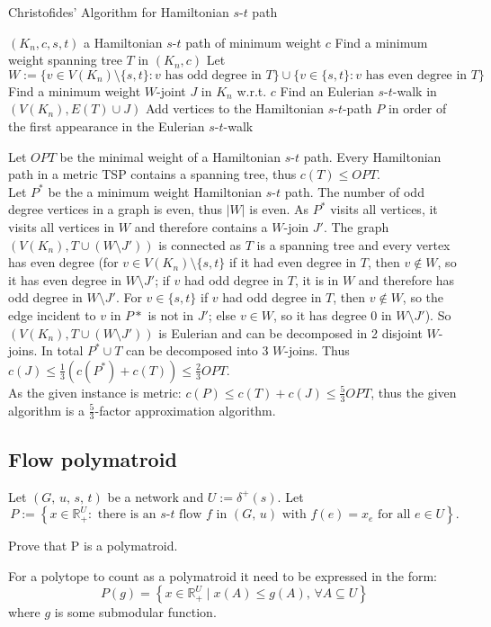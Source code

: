 \documentclass{article}
\newcommand{\R}{\mathbb{R}}
\begin{document}
  \begin{algorithm}
  \caption{Christofides' Algorithm for Hamiltonian $s$-$t$ path}\label{alg:cap}
  \begin{algorithmic}[1]
  \Require $(K_n, c, s, t)$
  \Ensure a Hamiltonian $s$-$t$ path of minimum weight $c$
  \State Find a minimum weight spanning tree $T$ in $(K_n,c)$
  \State Let $W:=\{v\in V(K_n)\setminus \{s,t\}: v \text{ has odd degree in }T \}\cup \{v\in \{s,t\}: v \text{ has even degree in }T \}$
  \State Find a minimum weight $W$-joint $J$ in $K_n$ w.r.t. $c$
  \State Find an Eulerian $s$-$t$-walk in $(V(K_n), E(T)\cup J)$
  \State Add vertices to the Hamiltonian $s$-$t$-path $P$ in order of the first appearance in the Eulerian $s$-$t$-walk
  \end{algorithmic}
  \end{algorithm}
  Let $OPT$ be the minimal weight of a Hamiltonian $s$-$t$ path. Every Hamiltonian path in a metric TSP contains a spanning tree, thus  $c(T)\leq OPT$.\\
  Let $P^*$ be the a minimum weight Hamiltonian $s$-$t$ path. The number of odd degree vertices in a graph is even, thus $|W|$ is even. As $P^*$ visits all vertices, it visits all vertices in $W$ and therefore contains a $W$-join $J'$. The graph $(V(K_n), T\cup (W\setminus J'))$ is connected as $T$ is a spanning tree and every vertex has even degree (for $v\in V(K_n)\setminus\{s,t\}$ if it had even degree in $T$, then $v\notin W$, so it has even degree in $W\setminus J'$; if $v$ had odd degree in $T$, it is in $W$ and therefore has odd degree in $W\setminus J'$. For $v\in \{s,t\}$ if $v$ had odd degree in $T$, then $v\notin W$, so the edge incident to $v$ in $P*$ is not in $J'$; else $v\in W$, so it has degree 0 in $W\setminus J'$). So $(V(K_n), T\cup (W\setminus J'))$ is Eulerian and can be decomposed in 2 disjoint $W$-joins.
  In total $P^*\cup T$ can be decomposed into 3 $W$-joins.
  Thus $c(J)\leq \frac 13 (c(P^*)+c(T))\leq\frac 23 OPT$.\\
  As the given instance is metric: $c(P)\leq c(T)+c(J)\leq \frac53 OPT$, thus the given algorithm is a  $\frac{5}{3}$-factor approximation algorithm.

  \subsection{Flow polymatroid}
  \begin{centerframebox}
    Let $(G,\, u,\, s,\, t)$ be a network and $U := \delta^+(s)$. Let
    \[ P := \left\{x\in\R_{+}^{U}:
    \textrm{ there is an }s\textrm{-}t\textrm{ flow } f \textrm{ in } (G,\, u)
    \textrm{ with } f(e) = x_e \textrm{ for all }
    e\in U \right\}. \]

    Prove that P is a polymatroid.
  \end{centerframebox}
  For a polytope to count as a polymatroid it need to be expressed in the form:
  \[ P(g) = \left\{x \in \R_+^U \mid x(A) \leq g(A),\, \forall A \subseteq U\right\} \]
  where $g$ is some submodular function.
\end{document}
